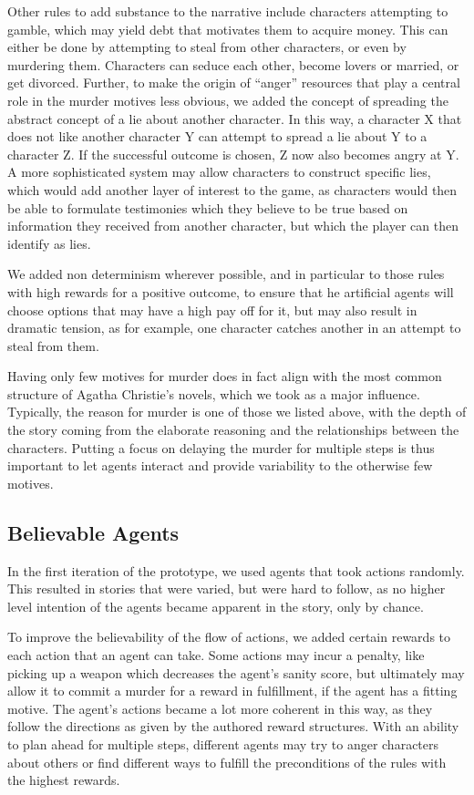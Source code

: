 Other rules to add substance to the narrative include characters attempting to gamble, which may yield debt that motivates them to acquire money.
This can either be done by attempting to steal from other characters, or even by murdering them.
Characters can seduce each other, become lovers or married, or get divorced.
Further, to make the origin of \enquote{anger} resources that play a central role in the murder motives less obvious, we added the concept of spreading the abstract concept of a lie about another character.
In this way, a character X that does not like another character Y can attempt to spread a lie about Y to a character Z.
If the successful outcome is chosen, Z now also becomes angry at Y.
A more sophisticated system may allow characters to construct specific lies, which would add another layer of interest to the game, as characters would then be able to formulate testimonies which they believe to be true based on information they received from another character, but which the player can then identify as lies.

We added non determinism wherever possible, and in particular to those rules with high rewards for a positive outcome, to ensure that he artificial agents will choose options that may have a high pay off for it, but may also result in dramatic tension, as for example, one character catches another in an attempt to steal from them.

Having only few motives for murder does in fact align with the most common structure of Agatha Christie's novels, which we took as a major influence.
Typically, the reason for murder is one of those we listed above, with the depth of the story coming from the elaborate reasoning and the relationships between the characters.
Putting a focus on delaying the murder for multiple steps is thus important to let agents interact and provide variability to the otherwise few motives.

\subsection{Believable Agents}
In the first iteration of the prototype, we used agents that took actions randomly. This resulted in stories that were varied, but were hard to follow, as no higher level intention of the agents became apparent in the story, only by chance.

To improve the believability of the flow of actions, we added certain rewards to each action that an agent can take. Some actions may incur a penalty, like picking up a weapon which decreases the agent's sanity score, but ultimately may allow it to commit a murder for a reward in fulfillment, if the agent has a fitting motive. The agent's actions became a lot more coherent in this way, as they follow the directions as given by the authored reward structures. With an ability to plan ahead for multiple steps, different agents may try to anger characters about others or find different ways to fulfill the preconditions of the rules with the highest rewards. 

